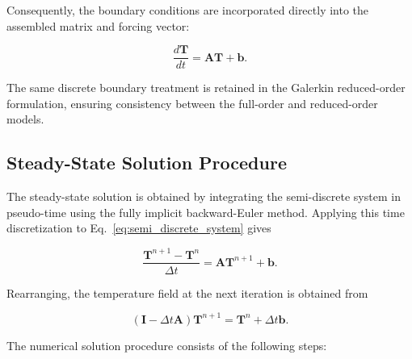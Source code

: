 Consequently, the boundary conditions are incorporated
directly into the assembled matrix and forcing vector:

\begin{equation}
    \frac{d\mathbf{T}}{dt}
    =
    \mathbf{A}\mathbf{T}+\mathbf{b}.
\end{equation}

The same discrete boundary treatment is retained in the
Galerkin reduced-order formulation, ensuring consistency
between the full-order and reduced-order models.

%


\subsection{Steady-State Solution Procedure}

The steady-state solution is obtained by integrating the
semi-discrete system in pseudo-time using the fully implicit
backward-Euler method. Applying this time discretization to
Eq.~\eqref{eq:semi_discrete_system} gives

\begin{equation}
    \frac{
    \mathbf{T}^{n+1}-\mathbf{T}^{n}
    }{\Delta t}
    =
    \mathbf{A}\mathbf{T}^{n+1}+\mathbf{b}.
\end{equation}

Rearranging, the temperature field at the next iteration
is obtained from

\begin{equation}
    \boxed{
    \left(
    \mathbf{I}-\Delta t\mathbf{A}
    \right)\mathbf{T}^{n+1}
    =
    \mathbf{T}^{n}+\Delta t\mathbf{b}.
    }
    \label{eq:backward_euler}
\end{equation}

The numerical solution procedure consists of the following
steps:

